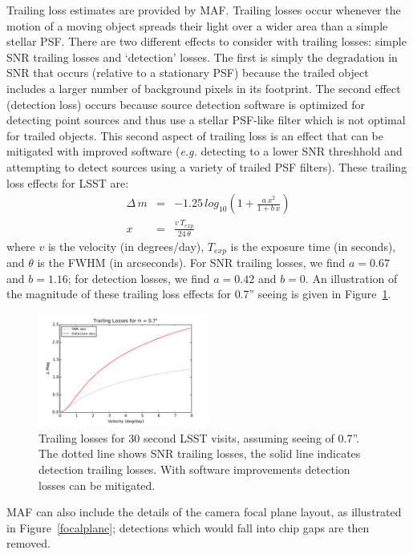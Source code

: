 \documentclass{iau}
\begin{document}
Trailing loss estimates are provided by MAF. Trailing losses
occur whenever the motion of a moving object spreads their light over
a wider area than a simple stellar PSF. There are two different
effects to consider with trailing losses: simple SNR trailing losses
and `detection' losses.  The first is simply the degradation in SNR
that occurs (relative to a stationary PSF) because the trailed object
includes a larger number of background pixels in its footprint. The
second effect (detection loss) occurs because source detection
software is optimized for detecting point sources and thus use a
stellar PSF-like filter which is not optimal for trailed objects.
This second aspect of trailing loss is an effect that can
be mitigated with improved software ({\it e.g.} detecting to a lower
SNR threshhold and attempting to detect
sources using a variety of trailed PSF filters). These trailing loss
effects for LSST are:
\begin{eqnarray}
\Delta \, m & = &-1.25 \, log_{10} \left( 1 + \frac{a \, x^2} { 1 + b\,
    x} \right) \\
x & = & \frac{v \, T_{exp}} {24 \, \theta} 
\end{eqnarray}
where $v$ is the velocity (in degrees/day), $T_{exp}$ is the exposure
time (in seconds), and $\theta$ is the FWHM (in arcseconds). For
SNR trailing losses, we find $a = 0.67$ and $b = 1.16$; for
detection losses, we find $a=0.42$ and $b=0$. An illustration of the
magnitude of these trailing loss effects for 0.7'' seeing is given in
Figure~\ref{trailinglosses}.

\begin{figure}
\centering
\includegraphics[width=0.5\textwidth]{trailing_losses}
\caption{Trailing losses for 30 second LSST visits, assuming seeing of
  0.7''. The dotted line shows SNR trailing losses, the solid line
  indicates  detection trailing losses. With software improvements
  detection losses can be mitigated.
\label{trailinglosses}}
\end{figure}

MAF can also include the details of the camera focal plane layout, as
illustrated in Figure~\ref{focalplane}; detections which would fall into
chip gaps are then removed.
\end{document}
